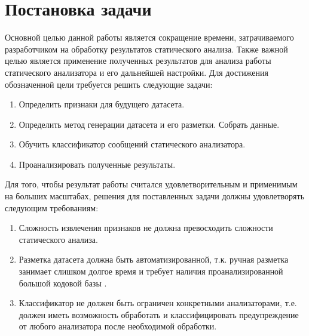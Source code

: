 \chapter{Постановка задачи}
\label{sec:Chapter1} 

Основной целью данной работы является сокращение времени, затрачиваемого разработчиком на обработку результатов статического анализа. Также важной целью является применение полученных результатов для анализа работы статического анализатора и его дальнейшей настройки. Для достижения обозначенной цели требуется решить следующие задачи:

\begin{enumerate}
    \item Определить признаки для будущего датасета.
    \item Определить метод генерации датасета и его разметки. Собрать данные.
    \item Обучить классификатор сообщений статического анализатора.
    \item Проанализировать полученные результаты.
\end{enumerate}

Для того, чтобы результат работы считался удовлетворительным и применимым на больших масштабах, решения для поставленных задачи должны удовлетворять следующим требованиям:

\begin{enumerate}
    \item Сложность извлечения признаков не должна превосходить сложности статического анализа.
    \item Разметка датасета должна быть автоматизированной, т.к. ручная разметка занимает слишком долгое время и требует наличия проанализированной большой кодовой базы \cite{Ayewah2010TheGF}.
    \item Классификатор не должен быть ограничен конкретными анализаторами, т.е. должен иметь возможность обработать и классифицировать предупреждение от любого анализатора после необходимой обработки.
\end{enumerate}

\newpage
